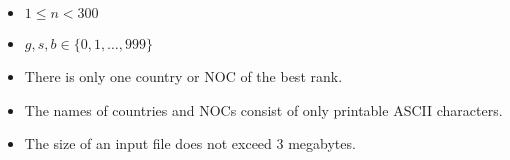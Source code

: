 \begin{itemize}
\tightlist
\item $1\le n< 300$
\item $g, s, b \in \{0,1,\dots,999\}$
\item There is only one country or NOC of the best rank.
\item The names of countries and NOCs consist of only printable ASCII characters.
\item The size of an input file does not exceed 3 megabytes.
\end{itemize}
